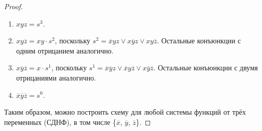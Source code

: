 \begin{proof}
    \begin{enumerate}[nolistsep]
        \item $xyz = s^3$.
        \item $xy\overline{z} = xy \cdot s^2$, поскольку $s^2 = \overline{x}yz \vee x\overline{y}z \vee xy\overline{z}$. Остальные конъюнкции с одним отрицанием аналогично.
        \item $x\overline{y}\overline{z} = x \cdot s^1$, поскольку $s^1 = \overline{x}\overline{y}z \vee \overline{x}y\overline{z} \vee x\overline{y}\overline{z}$. Остальные конъюнкции с двумя отрицаниями аналогично.
        \item $\overline{x}\overline{y}\overline{z} = s^0$.
    \end{enumerate}
    Таким образом, можно построить схему для любой системы функций от трёх переменных (СДНФ), в том числе \{$\overline{x}$, $\overline{y}$, $\overline{z}$\}.
\end{proof}